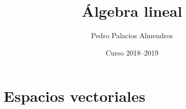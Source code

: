 \documentclass[a4paper, 10pt, openany]{report}
\title{Álgebra lineal}
\author{Pedro Palacios Almendros}
\date{Curso 2018--2019}
\begin{document}
\maketitle

\tableofcontents

\chapter{Espacios vectoriales}

\end{document}
